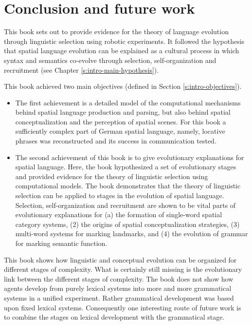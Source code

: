 %

\chapter{Conclusion and future work}

This book sets out to provide evidence for the theory
of language evolution through linguistic selection using robotic experiments. 
It followed the hypothesis that spatial language evolution can be explained 
as a cultural process in which syntax and semantics co-evolve through
selection, self-organization and recruitment (see Chapter \ref{s:intro-main-hypothesis}).

This book achieved two main objectives (defined  in Section \ref{s:intro-objectives}). 
\begin{itemize}
\item The first achievement is a detailed  model of the computational mechanisms behind 
spatial language production and parsing, but also behind spatial conceptualization
and the perception of spatial scenes. For this book a sufficiently complex 
part of German spatial language, namely, locative phrases was reconstructed and
its success in communication tested. 
\item The second achievement of this book is to give evolutionary explanations for spatial 
language. Here, the book hypothesized a set of evolutionary stages and provided
evidence for the theory of linguistic selection using computational models. 
The book demonstrates that the theory of linguistic selection can be applied 
to stages in the evolution of spatial language. Selection, self-organization and recruitment
are shown to be vital parts of evolutionary explanations for (a) the formation of single-word 
spatial category systems, (2) the origins of spatial conceptualization strategies, (3) 
multi-word systems for marking landmarks, and (4) the evolution of grammar for 
marking semantic function.
\end{itemize}
This book shows how linguistic and conceptual evolution can 
be organized for different stages of complexity. What is certainly still missing 
is the evolutionary link between the different stages of complexity. 
The book does not show how agents develop from purely lexical systems
into more and more grammatical systems in a unified experiment.
Rather grammatical development was based upon fixed lexical systems.
Consequently one interesting route of future work is to combine the stages on lexical
development with the grammatical stage.

